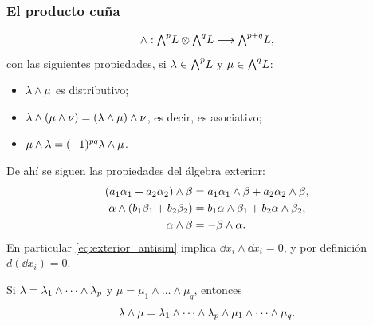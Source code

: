 \subsubsection{El producto cu\~na}
\label{subsubsec:producto_cuna_formas}

\begin{definicion}
  \label{def:cuna_formas}
  \begin{equation}
    \label{eq:cuna_formas}
    \wedge:\textstyle\bigwedge^{p}\!L\otimes\textstyle\bigwedge^{q}\!L\longrightarrow\textstyle\bigwedge^{p+q}\!L,
  \end{equation}
  con las siguientes propiedades, si $\lambda\in\textstyle\bigwedge^{p}\!L$ y $\mu\in\textstyle\bigwedge^{q}\!L$:
  \begin{itemize}
    \item $\lambda\wedge\mu$ es distributivo;
    \item $\lambda\wedge(\mu\wedge\nu)=(\lambda\wedge\mu)\wedge\nu$, es decir, es
          asociativo;
    \item $\mu\wedge\lambda=(-1)^{pq}\lambda\wedge\mu$.
  \end{itemize}
\end{definicion}

De ah\'i se siguen las propiedades del \'algebra exterior:
\begin{align}
  \label{eq:exterior_dist_izq}
  (a_1\alpha_1+a_2\alpha_2)\wedge\beta
    &=a_1\alpha_1\wedge\beta+a_2\alpha_2\wedge\beta,\\
  \label{eq:exterior_dist_der}
  \alpha\wedge(b_1\beta_1+b_2\beta_2)
    &=b_1\alpha\wedge\beta_1+b_2\alpha\wedge\beta_2,\\
  \label{eq:exterior_antisim}
  \alpha\wedge\beta&=-\beta\wedge\alpha .
\end{align}
En particular \eqref{eq:exterior_antisim} implica
$\dd x_i\wedge\dd x_i=0$, y por definici\'on $d(\dd x_i)=0$.

\begin{ejemplo}
  \label{ej:cuna_descompuesta}
  Si $\lambda=\lambda_1\wedge\dots\wedge\lambda_p$ y
  $\mu=\mu_1\wedge\dots\wedge\mu_q$, entonces
  \begin{equation}
    \label{eq:cuna_descompuesta}
    \lambda\wedge\mu
      =\lambda_1\wedge\dots\wedge\lambda_p\wedge\mu_1\wedge\dots\wedge\mu_q .
  \end{equation}
\end{ejemplo}

